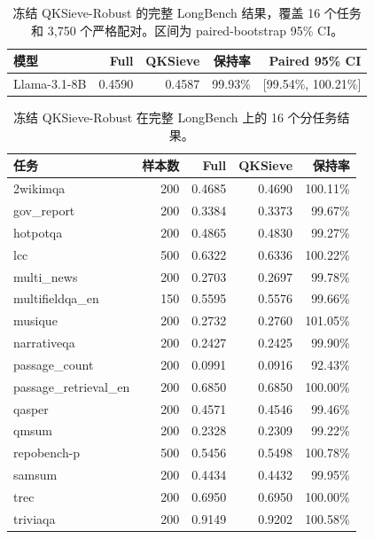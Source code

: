 \begin{table}[t]
\caption{冻结 QKSieve-Robust 的完整 LongBench 结果，覆盖 16 个任务和 3,750 个严格配对。区间为 paired-bootstrap 95\% CI。}
\label{tab:longbench-main}
\centering
\small
\begin{tabular}{lrrrr}
\toprule
模型 & Full & QKSieve & 保持率 & Paired 95\% CI \\
\midrule
Llama-3.1-8B & 0.4590 & 0.4587 & 99.93\% & [99.54\%, 100.21\%] \\
\bottomrule
\end{tabular}
\end{table}

\begin{table}[t]
\caption{冻结 QKSieve-Robust 在完整 LongBench 上的 16 个分任务结果。}
\label{tab:longbench-per-task}
\centering
\small
\begin{tabular}{lrrrr}
\toprule
任务 & 样本数 & Full & QKSieve & 保持率 \\
\midrule
2wikimqa & 200 & 0.4685 & 0.4690 & 100.11\% \\
gov\_report & 200 & 0.3384 & 0.3373 & 99.67\% \\
hotpotqa & 200 & 0.4865 & 0.4830 & 99.27\% \\
lcc & 500 & 0.6322 & 0.6336 & 100.22\% \\
multi\_news & 200 & 0.2703 & 0.2697 & 99.78\% \\
multifieldqa\_en & 150 & 0.5595 & 0.5576 & 99.66\% \\
musique & 200 & 0.2732 & 0.2760 & 101.05\% \\
narrativeqa & 200 & 0.2427 & 0.2425 & 99.90\% \\
passage\_count & 200 & 0.0991 & 0.0916 & 92.43\% \\
passage\_retrieval\_en & 200 & 0.6850 & 0.6850 & 100.00\% \\
qasper & 200 & 0.4571 & 0.4546 & 99.46\% \\
qmsum & 200 & 0.2328 & 0.2309 & 99.22\% \\
repobench-p & 500 & 0.5456 & 0.5498 & 100.78\% \\
samsum & 200 & 0.4434 & 0.4432 & 99.95\% \\
trec & 200 & 0.6950 & 0.6950 & 100.00\% \\
triviaqa & 200 & 0.9149 & 0.9202 & 100.58\% \\
\bottomrule
\end{tabular}
\end{table}

